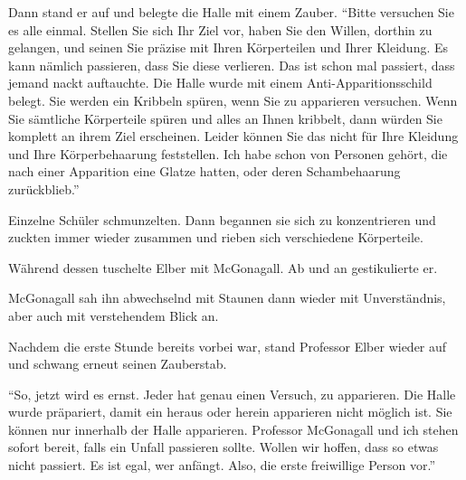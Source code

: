 Dann stand er auf und belegte die Halle mit einem Zauber. \enquote{Bitte versuchen Sie es alle einmal. Stellen Sie sich Ihr Ziel vor, haben Sie den Willen, dorthin zu gelangen, und seinen Sie präzise mit Ihren Körperteilen und Ihrer Kleidung. Es kann nämlich passieren, dass Sie diese verlieren. Das ist schon mal passiert, dass jemand nackt auftauchte. Die Halle wurde mit einem Anti-Apparitionsschild belegt. Sie werden ein Kribbeln spüren, wenn Sie zu apparieren versuchen. Wenn Sie sämtliche Körperteile spüren und alles an Ihnen kribbelt, dann würden Sie komplett an ihrem Ziel erscheinen. Leider können Sie das nicht für Ihre Kleidung und Ihre Körperbehaarung feststellen. Ich habe schon von Personen gehört, die nach einer Apparition eine Glatze hatten, oder deren Schambehaarung zurückblieb.}

Einzelne Schüler schmunzelten. Dann begannen sie sich zu konzentrieren und zuckten immer wieder zusammen und rieben sich verschiedene Körperteile.

Während dessen tuschelte Elber mit McGonagall. Ab und an gestikulierte er.


McGonagall sah ihn abwechselnd mit Staunen dann wieder mit Unverständnis, aber auch mit verstehendem Blick an.

Nachdem die erste Stunde bereits vorbei war, stand Professor Elber wieder auf und schwang erneut seinen Zauberstab.

\enquote{So, jetzt wird es ernst. Jeder hat genau einen Versuch, zu apparieren. Die Halle wurde präpariert, damit ein heraus oder herein apparieren nicht möglich ist. Sie können nur innerhalb der Halle apparieren. Professor McGonagall und ich stehen sofort bereit, falls ein Unfall passieren sollte. Wollen wir hoffen, dass so etwas nicht passiert. Es ist egal, wer anfängt. Also, die erste freiwillige Person vor.}

